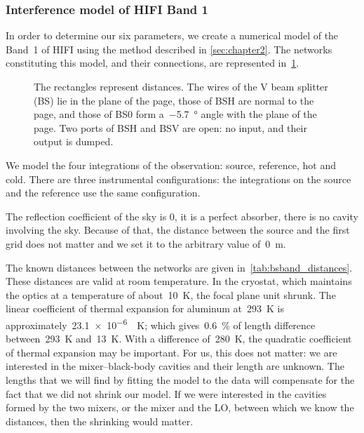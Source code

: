 \subsubsection{Interference model of HIFI Band 1}
\label{sec:interference_model_of_hifi_band_1}
In order to determine our six parameters, we create a numerical model of the Band~1 of HIFI using the method described in \cref{sec:chapter2}.
The networks constituting this model, and their connections, are represented in~\cref{fig:networks_band_1}.
\begin{figure}[hbtp]
    \centering
    
    \caption{The model of HIFI Band~1 has 15 networks.}
    \caption*{
        The rectangles represent distances.
        The wires of the V beam splitter (BS) lie in the plane of the page,
        those of BSH are normal to the page,
        and those of BS0 form a~\SI{-5.7}{\degree} angle with the plane of the page.
        Two ports of BSH and BSV are open: no input, and their output is dumped.
    }
    \label{fig:networks_band_1}
\end{figure}

We model the four integrations of the observation: source, reference, hot and cold.
There are three instrumental configurations: the integrations on the source and the reference use the same configuration.

The reflection coefficient of the sky is \num{0}, it is a perfect absorber, there is no cavity involving the sky.
Because of that, the distance between the source and the first grid does not matter and we set it to the arbitrary value of~\SI{0}{\meter}.


The known distances between the networks are given in~\cref{tab:bsband_distances}.
These distances are valid at room temperature.
In the cryostat, which maintains the optics at a temperature of about~\SI{10}{\kelvin}, the focal plane unit shrunk.
The linear coefficient of thermal expansion for aluminum at~\SI{293}{\kelvin} is approximately~\SI{23.1e-6}{\per\kelvin}; which gives~\SI{0.6}{\percent} of length difference between~\SI{293}{\kelvin} and~\SI{13}{\kelvin}.
With a difference of~\SI{280}{\kelvin}, the quadratic coefficient of thermal expansion may be important.
For us, this does not matter: we are interested in the mixer--black-body cavities and their
length are unknown.
The lengths that we will find by fitting the model to the data will compensate for the fact that we did not shrink our model.
If we were interested in the cavities formed by the two mixers, or the mixer and the LO, between which we know the distances, then the shrinking would matter.

